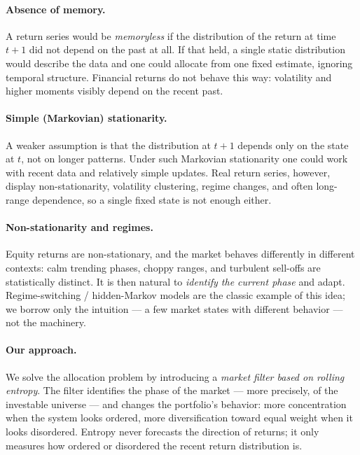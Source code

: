 \documentclass[a4paper,12pt]{article}
\begin{document}
\paragraph{Absence of memory.} A return series would be \emph{memoryless} if the distribution of the return at time \(t+1\) did not depend on the past at all. If that held, a single static distribution would describe the data and one could allocate from one fixed estimate, ignoring temporal structure. Financial returns do not behave this way: volatility and higher moments visibly depend on the recent past.

\paragraph{Simple (Markovian) stationarity.} A weaker assumption is that the distribution at \(t+1\) depends only on the state at \(t\), not on longer patterns. Under such Markovian stationarity one could work with recent data and relatively simple updates. Real return series, however, display non-stationarity, volatility clustering, regime changes, and often long-range dependence, so a single fixed state is not enough either.

\paragraph{Non-stationarity and regimes.} Equity returns are non-stationary, and the market behaves differently in different contexts: calm trending phases, choppy ranges, and turbulent sell-offs are statistically distinct. It is then natural to \emph{identify the current phase} and adapt. Regime-switching / hidden-Markov models \cite{hamilton} are the classic example of this idea; we borrow only the intuition --- a few market states with different behavior --- not the machinery.

\paragraph{Our approach.} We solve the allocation problem by introducing a \emph{market filter based on rolling entropy}. The filter identifies the phase of the market --- more precisely, of the investable universe --- and changes the portfolio's behavior: more concentration when the system looks ordered, more diversification toward equal weight when it looks disordered. Entropy never forecasts the direction of returns; it only measures how ordered or disordered the recent return distribution is.
\end{document}
